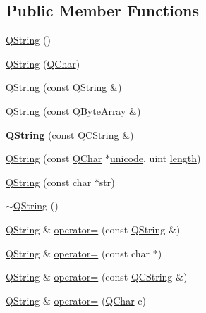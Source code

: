 \subsection*{Public Member Functions}
\begin{DoxyCompactItemize}
\item 
\mbox{\hyperlink{class_q_string_ac17675a27c6e32a31e04f07a5308a9cb}{Q\+String}} ()
\item 
\mbox{\hyperlink{class_q_string_aca2e82d8b16be0e3c61ede2c1f5a83b2}{Q\+String}} (\mbox{\hyperlink{class_q_char}{Q\+Char}})
\item 
\mbox{\hyperlink{class_q_string_ae6ff6f22247f503dbd0d49ecae567527}{Q\+String}} (const \mbox{\hyperlink{class_q_string}{Q\+String}} \&)
\item 
\mbox{\hyperlink{class_q_string_a247768790b0c679fde77b0b1bf511581}{Q\+String}} (const \mbox{\hyperlink{class_q_array}{Q\+Byte\+Array}} \&)
\item 
\mbox{\label{class_q_string_abc4fc66157abf50671aeaf47d4ceacc9}} 
{\bfseries Q\+String} (const \mbox{\hyperlink{class_q_c_string}{Q\+C\+String}} \&)
\item 
\mbox{\hyperlink{class_q_string_a1c92cd2bae630f25ed8516a7bc8c8258}{Q\+String}} (const \mbox{\hyperlink{class_q_char}{Q\+Char}} $\ast$\mbox{\hyperlink{class_q_string_af653a95345ba3cd5bade2a1e07f2bb58}{unicode}}, uint \mbox{\hyperlink{class_q_string_ac431a733d01111059c8364c62ed53270}{length}})
\item 
\mbox{\hyperlink{class_q_string_ac86c64fc0edc5d4c7347180dfa51e1d0}{Q\+String}} (const char $\ast$str)
\item 
\mbox{\hyperlink{class_q_string_afa89b9f5bbd0f59d390ddfae4972c34e}{$\sim$\+Q\+String}} ()
\item 
\mbox{\hyperlink{class_q_string}{Q\+String}} \& \mbox{\hyperlink{class_q_string_ac5c900af262dc166252f0866b6fa8d0e}{operator=}} (const \mbox{\hyperlink{class_q_string}{Q\+String}} \&)
\item 
\mbox{\hyperlink{class_q_string}{Q\+String}} \& \mbox{\hyperlink{class_q_string_a16f43f6efe6e1bf2d089d1915429b415}{operator=}} (const char $\ast$)
\item 
\mbox{\hyperlink{class_q_string}{Q\+String}} \& \mbox{\hyperlink{class_q_string_ad15235dbb2ee65e25be1104f88ee348d}{operator=}} (const \mbox{\hyperlink{class_q_c_string}{Q\+C\+String}} \&)
\item 
\mbox{\hyperlink{class_q_string}{Q\+String}} \& \mbox{\hyperlink{class_q_string_a69c0fc9ce4fc282c90c76bdf1af8ce55}{operator=}} (\mbox{\hyperlink{class_q_char}{Q\+Char}} c)

\end{DoxyCompactItemize}
